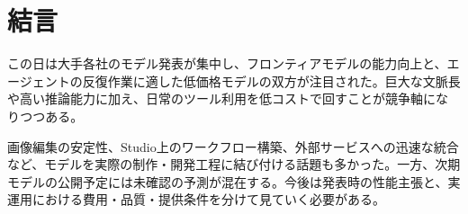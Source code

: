 \section{結言}
この日は大手各社のモデル発表が集中し、フロンティアモデルの能力向上と、エージェントの反復作業に適した低価格モデルの双方が注目された。巨大な文脈長や高い推論能力に加え、日常のツール利用を低コストで回すことが競争軸になりつつある。

画像編集の安定性、Studio上のワークフロー構築、外部サービスへの迅速な統合など、モデルを実際の制作・開発工程に結び付ける話題も多かった。一方、次期モデルの公開予定には未確認の予測が混在する。今後は発表時の性能主張と、実運用における費用・品質・提供条件を分けて見ていく必要がある。